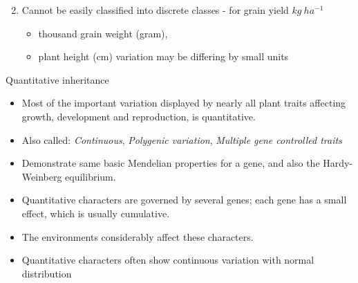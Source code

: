 \documentclass[11pt,dvipsnames,ignorenonframetext,aspectratio=169]{beamer}
\providecommand{\tightlist}{%
  \setlength{\itemsep}{0pt}\setlength{\parskip}{0pt}}
\begin{document}
\begin{frame}{}
\protect\hypertarget{section}{}

\begin{enumerate}
\setcounter{enumi}{1}
\tightlist
\item
  Cannot be easily classified into discrete classes - for grain yield
  \(kg~ha^{-1}\)

  \begin{itemize}
  \tightlist
  \item
    thousand grain weight (gram),
  \item
    plant height (cm) variation may be differing by small units
  \end{itemize}
\end{enumerate}

\end{frame}

\begin{frame}{Quantitative inheritance}
\protect\hypertarget{quantitative-inheritance}{}

\begin{itemize}
\tightlist
\item
  Most of the important variation displayed by nearly all plant traits
  affecting growth, development and reproduction, is quantitative.
\item
  Also called: \emph{Continuous}, \emph{Polygenic variation},
  \emph{Multiple gene controlled traits}
\item
  Demonstrate same basic Mendelian properties for a gene, and also the
  Hardy-Weinberg equilibrium.
\item
  Quantitative characters are governed by several genes; each gene has a
  small effect, which is usually cumulative.
\item
  The environments considerably affect these characters.
\item
  Quantitative characters often show continuous variation with normal
  distribution
\end{itemize}

\end{frame}
\end{document}
